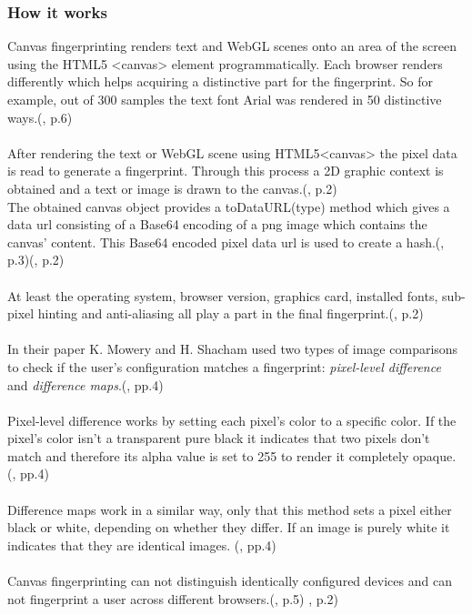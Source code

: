 \subsubsection{How it works}
Canvas fingerprinting renders text and WebGL scenes onto an area of the screen using the HTML5 <canvas> element programmatically. Each browser renders differently which helps acquiring a distinctive part for the fingerprint. So for example, out of 300 samples the text font Arial was rendered in 50 distinctive ways.(\textcite{mowery12}, p.6)\\\\
After rendering the text or WebGL scene using HTML5<canvas> the pixel data is read to generate a fingerprint. Through this process a 2D graphic context is obtained and a text or image is drawn to the canvas.(\textcite{upi15}, p.2)\\
The obtained canvas object provides a toDataURL(type) method which gives a data url consisting of a Base64 encoding of a png image which contains the canvas' content. This Base64 encoded pixel data url is used to create a hash.(\textcite{mowery12}, p.3)(\textcite{upi15}, p.2)\\\\
At least the operating system, browser version, graphics card, installed fonts, sub-pixel hinting and anti-aliasing all play a part in the final fingerprint.(\textcite{upi15}, p.2) \\\\
In their paper K. Mowery and H. Shacham used two types of image comparisons to check if the user's configuration matches a fingerprint: \textit{pixel-level difference} and \textit{difference maps}.(\textcite{mowery12}, pp.4)\\\\
Pixel-level difference works by setting each pixel's color to a specific color. If the pixel's color isn't a transparent pure black it indicates that two pixels don't match and therefore its alpha value is set to 255 to render it completely opaque. (\textcite{mowery12}, pp.4)\\\\
Difference maps work in a similar way, only that this method sets a pixel either black or white, depending on whether they differ. If an image is purely white it indicates that they are identical images. (\textcite{mowery12}, pp.4)\\\\
Canvas fingerprinting can not distinguish identically configured devices and can not fingerprint a user across different browsers.(\textcite{mowery12}, p.5) \textcite{upi15}, p.2)

